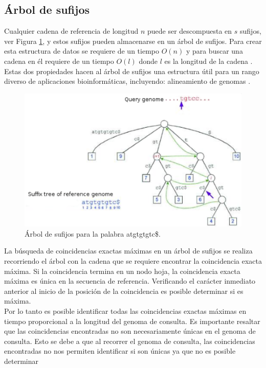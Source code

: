 \documentclass[12pt,a4paper]{article}
\begin{document}
\subsection{Árbol de sufijos}
\indent
 Cualquier cadena de referencia de longitud $n$ puede ser descompuesta en $s$ sufijos, ver
 Figura \ref{fig:st}, y estos sufijos pueden almacenarse en un árbol de sufijos.
 Para crear esta estructura de datos se requiere de un tiempo $O(n)$ y para
 buscar una cadena en él requiere de un tiempo $O(l)$ donde $l$ es la longitud
 de la cadena \cite{Gusfield2007Algorithms}. Estas dos propiedades hacen al árbol
 de sufijos una estructura útil para un rango diverso de aplicaciones
 bioinformáticas, incluyendo: alineamiento de genomas \cite{Mummer3}.\\
   \begin{figure}[h] 
   \centering 
   \includegraphics[scale=0.8]{st-mum.eps} 
   \caption{Árbol de sufijos para la palabra atgtgtgtc\$.} 
   \label{fig:st} 
 \end{figure}
\indent
La búsqueda de coincidencias exactas máximas en un árbol de sufijos se realiza recorriendo el árbol
con la cadena que se requiere encontrar la coincidencia exacta máxima. Si la coincidencia termina en 
un nodo hoja, la coincidencia exacta máxima es única en la secuencia de referencia. Verificando el 
carácter inmediato anterior al inicio de la posición de la coincidencia es posible determinar si es
máxima.\\
\indent
Por lo tanto es posible identificar todas las coincidencias exactas máximas en tiempo proporcional a
la longitud del genoma de consulta. Es importante resaltar que las coincidencias encontradas no son
necesariamente únicas en el genoma de consulta. Esto se debe a que al recorrer el genoma de consulta, 
las coincidencias encontradas no nos permiten identificar si son únicas ya que no es posible determinar
\end{document}
